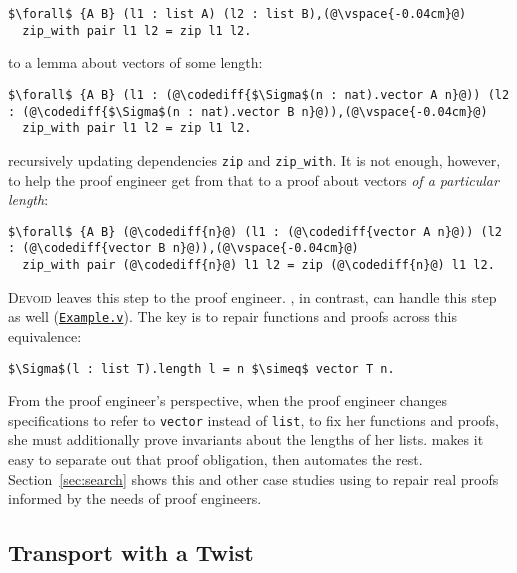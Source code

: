 \begin{lstlisting}
$\forall$ {A B} (l1 : list A) (l2 : list B),(@\vspace{-0.04cm}@)
  zip_with pair l1 l2 = zip l1 l2.
\end{lstlisting}
to a lemma about vectors of some length:

\begin{lstlisting}
$\forall$ {A B} (l1 : (@\codediff{$\Sigma$(n : nat).vector A n}@)) (l2 : (@\codediff{$\Sigma$(n : nat).vector B n}@)),(@\vspace{-0.04cm}@)
  zip_with pair l1 l2 = zip l1 l2.
\end{lstlisting}
recursively updating dependencies \lstinline{zip} and \lstinline{zip_with}.
It is not enough, however, to help the proof engineer get from that to a proof about vectors \textit{of a particular length}:

\begin{lstlisting}
$\forall$ {A B} (@\codediff{n}@) (l1 : (@\codediff{vector A n}@)) (l2 : (@\codediff{vector B n}@)),(@\vspace{-0.04cm}@)
  zip_with pair (@\codediff{n}@) l1 l2 = zip (@\codediff{n}@) l1 l2.
\end{lstlisting}

\textsc{Devoid} leaves this step to the proof engineer.
\toolname, in contrast, can handle this step as well (\href{https://github.com/uwplse/pumpkin-pi/blob/master/plugin/coq/examples/Example.v}{\lstinline{Example.v}}).
The key is to repair functions and proofs across this equivalence:

\begin{lstlisting}
$\Sigma$(l : list T).length l = n $\simeq$ vector T n.
\end{lstlisting}
From the proof engineer's perspective, when the proof engineer changes specifications to refer to \lstinline{vector} instead of \lstinline{list},
to fix her functions and proofs, she must additionally prove invariants about the lengths of her lists.
\toolname makes it easy to separate out that proof obligation, then automates the rest.
Section~\ref{sec:search} shows this and other case studies using \toolname to repair real proofs
informed by the needs of proof engineers.


\subsection{Transport with a Twist}
\label{sec:repair}

